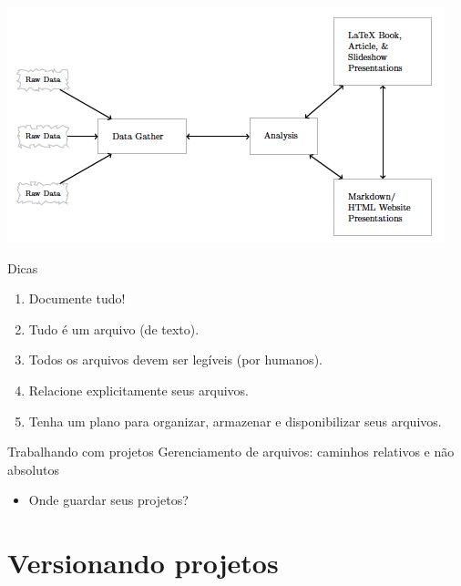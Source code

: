 \documentclass[
  9pt,
  ignorenonframetext,
]{beamer}
\providecommand{\tightlist}{%
  \setlength{\itemsep}{0pt}\setlength{\parskip}{0pt}}
\begin{document}
\begin{frame}{}
\protect\hypertarget{section}{}
\begin{center}\includegraphics[width=1\linewidth]{imgs/fluxo_gandrud} \end{center}
\end{frame}

\begin{frame}{Dicas}
\protect\hypertarget{dicas}{}
\begin{enumerate}
\item
  Documente tudo!
\item
  Tudo é um arquivo (de texto).
\item
  Todos os arquivos devem ser legíveis (por humanos).
\item
  Relacione explicitamente seus arquivos.
\item
  Tenha um plano para organizar, armazenar e disponibilizar seus
  arquivos.
\end{enumerate}
\end{frame}

\begin{frame}{Trabalhando com projetos}
\protect\hypertarget{trabalhando-com-projetos}{}
Gerenciamento de arquivos: caminhos relativos e não absolutos

\begin{itemize}
\tightlist
\item
  Onde guardar seus projetos?
\end{itemize}
\end{frame}

\hypertarget{versionando-projetos}{%
\section{Versionando projetos}\label{versionando-projetos}}
\end{document}
